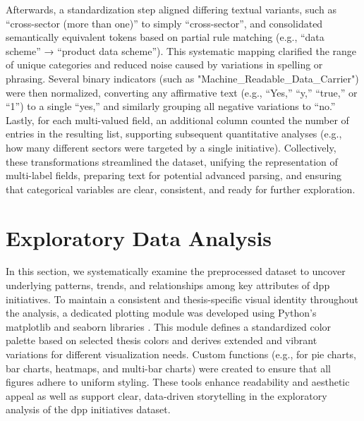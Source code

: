 Afterwards, a standardization step aligned differing textual variants, such as “cross-sector (more than one)” to simply “cross-sector”, and consolidated semantically equivalent tokens based on partial rule matching (e.g., “data scheme” → “product data scheme”). This systematic mapping clarified the range of unique categories and reduced noise caused by variations in spelling or phrasing. Several binary indicators (such as "Machine\_Readable\_Data\_Carrier") were then normalized, converting any affirmative text (e.g., “Yes,” “y,” “true,” or “1”) to a single “yes,” and similarly grouping all negative variations to “no.” Lastly, for each multi-valued field, an additional column counted the number of entries in the resulting list, supporting subsequent quantitative analyses (e.g., how many different sectors were targeted by a single initiative). Collectively, these transformations streamlined the dataset, unifying the representation of multi-label fields, preparing text for potential advanced parsing, and ensuring that categorical variables are clear, consistent, and ready for further exploration.

\section{Exploratory Data Analysis}
\label{sec:data_analysis}

In this section, we systematically examine the preprocessed dataset to uncover underlying patterns, trends, and relationships among key attributes of \ac{dpp} initiatives. To maintain a consistent and thesis-specific visual identity throughout the analysis, a dedicated plotting module was developed using Python's matplotlib and seaborn libraries \autocite{PythonSoftwareFoundation.n.d.}. This module defines a standardized color palette based on selected thesis colors and derives extended and vibrant variations for different visualization needs. Custom functions (e.g., for pie charts, bar charts, heatmaps, and multi-bar charts) were created to ensure that all figures adhere to uniform styling. These tools enhance readability and aesthetic appeal as well as support clear, data-driven storytelling in the exploratory analysis of the \ac{dpp} initiatives dataset.

